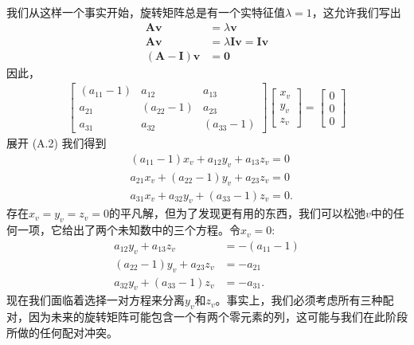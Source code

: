 我们从这样一个事实开始，旋转矩阵总是有一个实特征值$\lambda=1$，这允许我们写出
$$
\begin{aligned}
\mathbf{A} \mathbf{v} & =\lambda \mathbf{v} \\
\mathbf{A v} & =\lambda \mathbf{I} \mathbf{v}=\mathbf{I} \mathbf{v} \\
(\mathbf{A}-\mathbf{I}) \mathbf{v} & =\mathbf{0}
\end{aligned}
$$
因此，
\begin{align}
\left[\begin{array}{ccc}
\left(a_{11}-1\right) & a_{12} & a_{13} \\
a_{21} & \left(a_{22}-1\right) & a_{23} \\
a_{31} & a_{32} & \left(a_{33}-1\right)
\end{array}\right]\left[\begin{array}{l}
x_{v} \\
y_{v} \\
z_{v}
\end{array}\right]=\left[\begin{array}{l}
0 \\
0 \\
0
\end{array}\right]
\end{align}
展开 (A.2) 我们得到
$$
\begin{aligned}
& \left(a_{11}-1\right) x_{v}+a_{12} y_{v}+a_{13} z_{v}=0 \\
& a_{21} x_{v}+\left(a_{22}-1\right) y_{v}+a_{23} z_{v}=0 \\
& a_{31} x_{v}+a_{32} y_{v}+\left(a_{33}-1\right) z_{v}=0 .
\end{aligned}
$$
存在$x_{v}=y_{v}=z_{v}=0$的平凡解，但为了发现更有用的东西，我们可以松弛$v$中的任何一项，它给出了两个未知数中的三个方程。令$x_{v}=0$:
\begin{align}
a_{12} y_{v}+a_{13} z_{v} & =-\left(a_{11}-1\right) \\
\left(a_{22}-1\right) y_{v}+a_{23} z_{v} & =-a_{21} \\
a_{32} y_{v}+\left(a_{33}-1\right) z_{v} & =-a_{31} .
\end{align}
现在我们面临着选择一对方程来分离$y_{v}$和$z_{v}$。事实上，我们必须考虑所有三种配对，因为未来的旋转矩阵可能包含一个有两个零元素的列，这可能与我们在此阶段所做的任何配对冲突。


